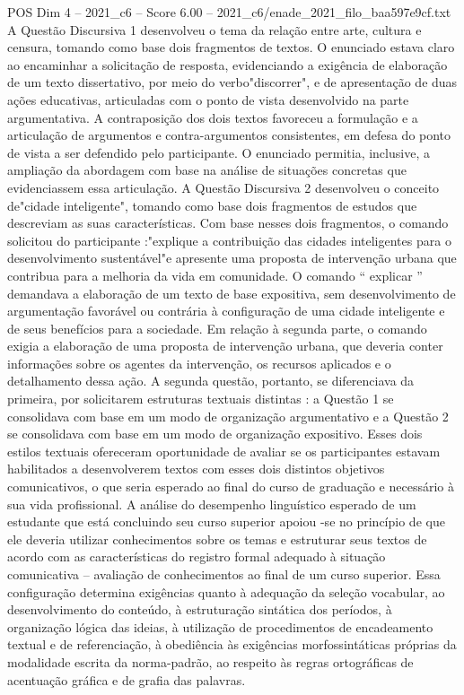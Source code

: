 \begin{textsample}{POS Dim 4 – 2021\_c6 – Score 6.00 – 2021\_c6/enade\_2021\_filo\_baa597e9cf.txt}
A Questão Discursiva 1 desenvolveu o tema da relação entre arte, cultura e censura, tomando como base dois fragmentos de textos.
O enunciado estava claro ao encaminhar a solicitação de resposta, evidenciando a exigência de elaboração de um texto dissertativo, por meio do verbo"discorrer", e de apresentação de duas ações educativas, articuladas com o ponto de vista desenvolvido na parte argumentativa.
A contraposição dos dois textos favoreceu a formulação e a articulação de argumentos e contra-argumentos consistentes, em defesa do ponto de vista a ser defendido pelo participante.
O enunciado permitia, inclusive, a ampliação da abordagem com base na análise de situações concretas que evidenciassem essa articulação.
A Questão Discursiva 2 desenvolveu o conceito de"cidade inteligente", tomando como base dois fragmentos de estudos que descreviam as suas características.
Com base nesses dois fragmentos, o comando solicitou do participante :"explique a contribuição das cidades inteligentes para o desenvolvimento sustentável"e apresente uma proposta de intervenção urbana que contribua para a melhoria da vida em comunidade.
O comando “ explicar ” demandava a elaboração de um texto de base expositiva, sem desenvolvimento de argumentação favorável ou contrária à configuração de uma cidade inteligente e de seus benefícios para a sociedade.
Em relação à segunda parte, o comando exigia a elaboração de uma proposta de intervenção urbana, que deveria conter informações sobre os agentes da intervenção, os recursos aplicados e o detalhamento dessa ação.
A segunda questão, portanto, se diferenciava da primeira, por solicitarem estruturas textuais distintas : a Questão 1 se consolidava com base em um modo de organização argumentativo e a Questão 2 se consolidava com base em um modo de organização expositivo.
Esses dois estilos textuais ofereceram oportunidade de avaliar se os participantes estavam habilitados a desenvolverem textos com esses dois distintos objetivos comunicativos, o que seria esperado ao final do curso de graduação e necessário à sua vida profissional.
A análise do desempenho linguístico esperado de um estudante que está concluindo seu curso superior apoiou -se no princípio de que ele deveria utilizar conhecimentos sobre os temas e estruturar seus textos de acordo com as características do registro formal adequado à situação comunicativa – avaliação de conhecimentos ao final de um curso superior.
Essa configuração determina exigências quanto à adequação da seleção vocabular, ao desenvolvimento do conteúdo, à estruturação sintática dos períodos, à organização lógica das ideias, à utilização de procedimentos de encadeamento textual e de referenciação, à obediência às exigências morfossintáticas próprias da modalidade escrita da norma-padrão, ao respeito às regras ortográficas de acentuação gráfica e de grafia das palavras.

\end{textsample}
